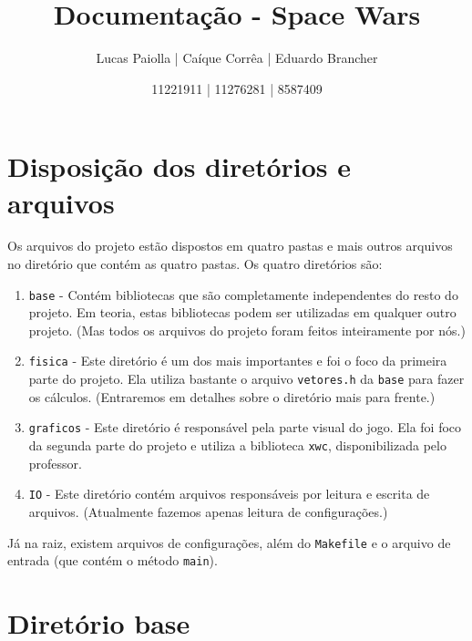 \documentclass[12pt, a4paper]{article}
\title{Documentação - Space Wars}
\author{Lucas Paiolla | Caíque Corrêa | Eduardo Brancher}
\date{11221911 | 11276281 | 8587409}
\begin{document}
    \maketitle
    \newpage

    \tableofcontents
    \newpage

    \section{Disposição dos diretórios e arquivos}

    Os arquivos do projeto estão dispostos em quatro pastas e mais outros arquivos
    no diretório que contém as quatro pastas. Os quatro diretórios são:
        \begin{enumerate}
            \item \texttt{base} - Contém bibliotecas que são completamente independentes
            do resto do projeto. Em teoria, estas bibliotecas podem ser utilizadas
            em qualquer outro projeto. (Mas todos os arquivos do projeto foram
            feitos inteiramente por nós.)

            \item \texttt{fisica} - Este diretório é um dos mais importantes e foi o foco
            da primeira parte do projeto. Ela utiliza bastante o arquivo 
            \texttt{vetores.h} da \texttt{base} para fazer os cálculos. 
            (Entraremos em detalhes sobre o diretório mais para frente.)

            \item \texttt{graficos} - Este diretório é responsável pela parte visual
            do jogo. Ela foi foco da segunda parte do projeto e utiliza a biblioteca
            \texttt{xwc}, disponibilizada pelo professor.

            \item \texttt{IO} - Este diretório contém arquivos responsáveis por leitura
            e escrita de arquivos. (Atualmente fazemos apenas leitura de configurações.)

        \end{enumerate}

        Já na raiz, existem arquivos de configurações, além do \texttt{Makefile} e o arquivo 
        de entrada (que contém o método \texttt{main}).
    
    \newpage

    \section{Diretório base}
\end{document}
